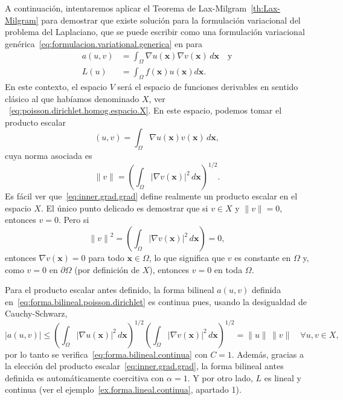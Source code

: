\documentclass[11pt]{report}
\theoremstyle{plain}
\theoremstyle{definition}
\newcommand{\xx}{\ensuremath{\mathbf{x}}\xspace}
\newcommand{\uu}{\ensuremath{u}\xspace}
\newcommand{\vv}{\ensuremath{v}\xspace}
\newcommand{\grad}{\ensuremath{\nabla}}
\newcommand{\abs}[1]{\ensuremath{|#1|}}
\newcommand{\norm}[1]{\ensuremath{\|#1\|}}
\newcommand{\inner}[2]{\ensuremath{\left(#1,#2\right)}}
\begin{document}
A continuación, intentaremos aplicar el Teorema de Lax-Milgram~\ref{th:Lax-Milgram} para demostrar que existe solución para la formulación variacional del problema del Laplaciano, que se puede escribir como una formulación variacional genérica~\eqref{eq:formulacion.variational.generica} en para
\begin{align}
  \label{eq:forma.bilineal.poisson.dirichlet}
  a(u,v) &= \int_\Omega \nabla u(\xx) \nabla v(\xx) \,d\xx \quad\text{y} \\
  \label{eq:forma.lineal.poisson.dirichlet}
  L(u) &= \int_\Omega f(\xx) u(\xx) d\xx.
\end{align}
En este contexto, el espacio $V$ será el espacio de funciones derivables en sentido clásico al que habíamos denominado $X$, ver ~\eqref{eq:poisson.dirichlet.homog.espacio.X}. En este espacio, podemos tomar el producto escalar
\begin{equation}
  \label{eq:inner.grad.grad}
  \inner{\uu}{\vv} = \int_\Omega \grad\uu(\xx)\vv(\xx)\, d\xx,
\end{equation}
cuya norma asociada es 
\begin{displaymath}
  \norm{\vv}=\left(\int_\Omega \left|\grad\vv(\xx)\right|^2\, d\xx\right)^{1/2}.
\end{displaymath}
Es fácil ver que~\eqref{eq:inner.grad.grad} define realmente un producto escalar en el espacio $X$. El único punto delicado es demostrar que si $\vv\in X$ y $\norm{\vv}=0$, entonces $\vv=0$. Pero si
\begin{displaymath}
  \norm{\vv}^2=\left(\int_\Omega \left|\grad\vv(\xx)\right|^2\, d\xx\right) = 0,
\end{displaymath}
entonces $\grad\vv(\xx)=0$ para todo $\xx\in\Omega$, lo que significa que $\vv$ es constante en $\Omega$ y, como $\vv=0$ en $\partial\Omega$ (por definición de $X$), entonces $\vv=0$ en toda $\Omega$.

Para el producto escalar antes definido, la forma bilineal $a(\uu,\vv)$ definida en~\eqref{eq:forma.bilineal.poisson.dirichlet} es continua pues, usando la desigualdad de Cauchy-Schwarz,
\begin{displaymath}
  \abs{a(\uu,\vv)}\le \left(\int_\Omega \left|\grad\uu(\xx)\right|^2\, d\xx\right)^{1/2}\left(\int_\Omega \left|\grad\vv(\xx)\right|^2\, d\xx\right)^{1/2} = \norm{\uu}\,\norm{\vv}\quad\forall\uu,\vv\in X, 
\end{displaymath}
por lo tanto se verifica~\eqref{eq:forma.bilineal.continua} con $C=1$.
Además, gracias a la elección del producto escalar~\eqref{eq:inner.grad.grad}, la forma bilineal antes definida es automáticamente coercitiva con $\alpha=1$. Y por otro lado, $L$ es lineal y continua (ver el ejemplo~\ref{ex.forma.lineal.continua}, apartado 1).
\end{document}
